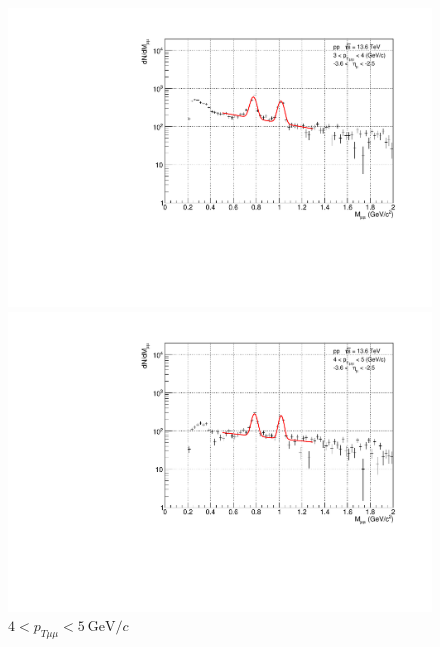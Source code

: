 \begin{figure}[H]
\begin{minipage}{0.45\textwidth}
                        \captionsetup{labelformat=empty}
                        \caption*{$2 < p_{T\mu\mu} < 3\ \mathrm{GeV}/c$}
                    \end{minipage}
                    \\
                    \vspace{1em}
                    \begin{minipage}{0.45\textwidth}
                        \centering
                        \includegraphics[width=\textwidth]{fig/3_4_2_fit_pt_3to4.pdf}
                        \captionsetup{labelformat=empty}
                        \caption*{$3 < p_{T\mu\mu} < 4\ \mathrm{GeV}/c$}
                    \end{minipage}
                    \hfill
                    \begin{minipage}{0.45\textwidth}
                        \centering
                        \includegraphics[width=\textwidth]{fig/3_4_2_fit_pt_4to5.pdf}
                        \captionsetup{labelformat=empty}
                        \caption*{$4 < p_{T\mu\mu} < 5\ \mathrm{GeV}/c$} 
    

\end{minipage}
\end{figure}
